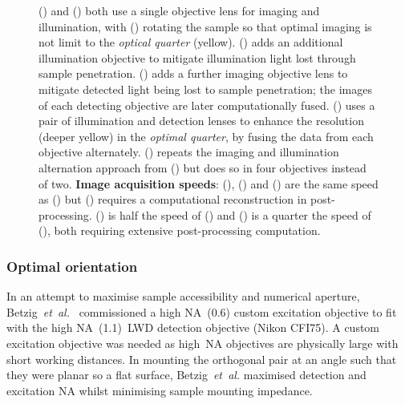 \begin{figure}
    \ContinuedFloat
      \caption{
        () and () both use a single objective lens for imaging and illumination, with () rotating the sample so that optimal imaging is not limit to the \emph{optical quarter} (yellow).
        () adds an additional illumination objective to mitigate illumination light lost through sample penetration.
        () adds a further imaging objective lens to mitigate detected light being lost to sample penetration; the images of each detecting objective are later computationally fused.
        () uses a pair of illumination and detection lenses to enhance the resolution (deeper yellow) in the \emph{optimal quarter}, by fusing the data from each objective alternately.
        () repeats the imaging and illumination alternation approach from () but does so in four objectives instead of two.
        \textbf{Image acquisition speeds}:
        (), () and () are the same speed as () but () requires a computational reconstruction in post-processing.
        () is half the speed of () and () is a quarter the speed of (), both requiring extensive post-processing computation.
      }
    \label{fig:spim_optimal_imaging}
\end{figure}


\subsubsection{Optimal orientation}

In an attempt to maximise sample accessibility and numerical aperture, Betzig~\emph{et~al.}~\cite{chenLatticeLightSheetMicroscopy2014} commissioned a high \gls{NA}~(\SI{0.6}{}) custom excitation objective to fit with the high \gls{NA}~(\SI{1.1}{})~\gls{LWD} detection objective (Nikon CFI75).
A custom excitation objective was needed as high~\gls{NA} objectives are physically large with short \gls{working distance}s.
In mounting the orthogonal pair at an angle such that they were planar so a flat surface, Betzig~\emph{et~al.} maximised detection and excitation \gls{NA} whilst minimising sample mounting impedance.

